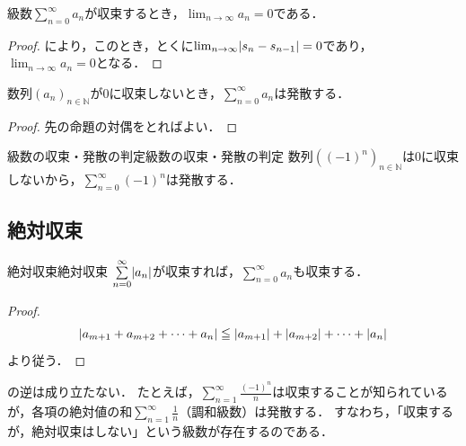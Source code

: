 \begin{cor}{}{}
  級数$\sum_{n=0}^{\infty} a_n$が収束するとき，$\lim_{n \to \infty} a_n =0$である．
\end{cor}

\begin{leftbar}
  \begin{proof}
    により，このとき，とくに$\lim_{n \to \infty} \lvert s_{n}-s_{n-1}\rvert=0$であり，$\lim_{n \to \infty} a_n =0$となる．
  \end{proof}
\end{leftbar}

\begin{cor}{}{}
  数列$(a_n)_{n \in \mathbb{N}}$が$0$に収束しないとき，$\sum_{n=0}^{\infty} a_n$は発散する．
\end{cor}

\begin{leftbar}
\begin{proof}
  先の命題の対偶をとればよい．
\end{proof}
\end{leftbar}

\begin{example}{級数の収束・発散の判定}{級数の収束・発散の判定}
  数列$((-1)^n)_{n \in \mathbb{N}}$は$0$に収束しないから，$\sum_{n=0}^{\infty} (-1)^n$は発散する．
\end{example}

\subsection{絶対収束}

\begin{prop}{絶対収束}{絶対収束}
  $\sum_{n=0}^{\infty} \abs{a_n}$が収束すれば，$\sum_{n=0}^{\infty} a_n$も収束する．
\end{prop}

\begin{leftbar}
  \begin{proof}
    \[
      \lvert a_{m+1}+a_{m+2}+\cdots+a_{n}\rvert \leqq \lvert a_{m+1}\rvert+\lvert a_{m+2}\rvert+\cdots+\lvert a_{n}\rvert
    \]
    より従う．
  \end{proof}
\end{leftbar}

\begin{remark}[逆は成り立たない]
  の逆は成り立たない．
  たとえば，$\sum_{n=1}^{\infty} \frac{(-1)^n}{n}$は収束することが知られているが，各項の絶対値の和$\sum_{n=1}^{\infty} \frac{1}{n}$（調和級数）は発散する．
  すなわち，「収束するが，絶対収束はしない」という級数が存在するのである．
\end{remark}

